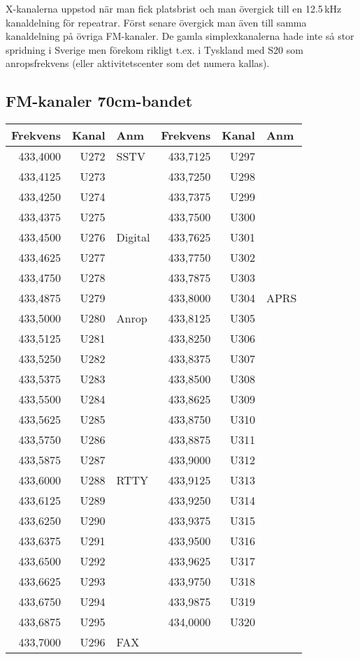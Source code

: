 X-kanalerna uppstod när man fick platsbrist och man övergick till en
12.5\,kHz kanaldelning för repeatrar. Först senare övergick man även
till samma kanaldelning på övriga FM-kanaler. De gamla
simplexkanalerna hade inte så stor spridning i Sverige men förekom
rikligt t.ex. i Tyskland med S20 som anropsfrekvens (eller
aktivitetscenter som det numera kallas).


\subsection{FM-kanaler 70cm-bandet}

\begin{longtable}{rrl|rrl}
\textbf{Frekvens} & \textbf{Kanal} & \textbf{Anm} &
\textbf{Frekvens} & \textbf{Kanal} & \textbf{Anm} \\ \hline

433,4000 & U272 & SSTV    & 433,7125 & U297 &      \\
433,4125 & U273 &         & 433,7250 & U298 &      \\
433,4250 & U274 &         & 433,7375 & U299 &      \\
433,4375 & U275 &         & 433,7500 & U300 &      \\
433,4500 & U276 & Digital & 433,7625 & U301 &      \\
433,4625 & U277 &         & 433,7750 & U302 &      \\
433,4750 & U278 &         & 433,7875 & U303 &      \\
433,4875 & U279 &         & 433,8000 & U304 & APRS \\
433,5000 & U280 & Anrop   & 433,8125 & U305 &      \\
433,5125 & U281 &         & 433,8250 & U306 &      \\
433,5250 & U282 &         & 433,8375 & U307 &      \\
433,5375 & U283 &         & 433,8500 & U308 &      \\
433,5500 & U284 &         & 433,8625 & U309 &      \\
433,5625 & U285 &         & 433,8750 & U310 &      \\
433,5750 & U286 &         & 433,8875 & U311 &      \\
433,5875 & U287 &         & 433,9000 & U312 &      \\
433,6000 & U288 & RTTY    & 433,9125 & U313 &      \\
433,6125 & U289 &         & 433,9250 & U314 &      \\
433,6250 & U290 &         & 433,9375 & U315 &      \\
433,6375 & U291 &         & 433,9500 & U316 &      \\
433,6500 & U292 &         & 433,9625 & U317 &      \\
433,6625 & U293 &         & 433,9750 & U318 &      \\
433,6750 & U294 &         & 433,9875 & U319 &      \\
433,6875 & U295 &         & 434,0000 & U320 &      \\
433,7000 & U296 & FAX     &          &      &      \\

\end{longtable}

